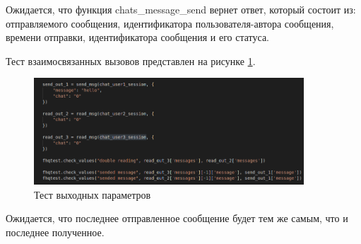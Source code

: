 Ожидается, что функция chats\_message\_send вернет ответ, который состоит из: отправляемого сообщения, идентификатора пользователя-автора сообщения, времени отправки,
идентификатора сообщения и его статуса. 

Тест взаимосвязанных вызовов представлен на рисунке \ref{img:test_call}.

\begin{figure}[h!]
    \centering
    \includegraphics[width=0.9\textwidth]{images/test_call}
    \caption{Тест выходных параметров}
    \label{img:test_call}
\end{figure}

\vspace{15em}

Ожидается, что последнее отправленное сообщение будет тем же самым, что и последнее полученное. 